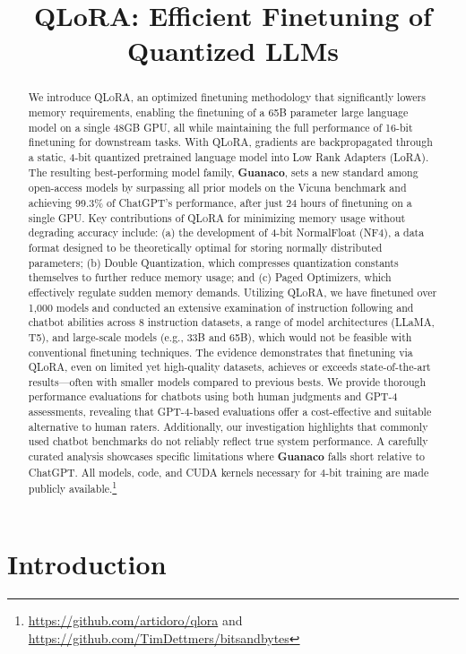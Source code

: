 \title{QLoRA: Efficient Finetuning of Quantized LLMs}

\begin{abstract}
We introduce \textsc{QLoRA}, an optimized finetuning methodology that significantly lowers memory requirements, enabling the finetuning of a 65B parameter large language model on a single 48GB GPU, all while maintaining the full performance of 16-bit finetuning for downstream tasks. With \textsc{QLoRA}, gradients are backpropagated through a static, 4-bit quantized pretrained language model into Low Rank Adapters (LoRA). The resulting best-performing model family, \textbf{Guanaco}, sets a new standard among open-access models by surpassing all prior models on the Vicuna benchmark and achieving 99.3\% of ChatGPT's performance, after just 24 hours of finetuning on a single GPU. Key contributions of \textsc{QLoRA} for minimizing memory usage without degrading accuracy include: (a) the development of 4-bit NormalFloat (NF4), a data format designed to be theoretically optimal for storing normally distributed parameters; (b) Double Quantization, which compresses quantization constants themselves to further reduce memory usage; and (c) Paged Optimizers, which effectively regulate sudden memory demands. Utilizing \textsc{QLoRA}, we have finetuned over 1,000 models and conducted an extensive examination of instruction following and chatbot abilities across 8 instruction datasets, a range of model architectures (LLaMA, T5), and large-scale models (e.g., 33B and 65B), which would not be feasible with conventional finetuning techniques. The evidence demonstrates that finetuning via QLoRA, even on limited yet high-quality datasets, achieves or exceeds state-of-the-art results—often with smaller models compared to previous bests. We provide thorough performance evaluations for chatbots using both human judgments and GPT-4 assessments, revealing that GPT-4-based evaluations offer a cost-effective and suitable alternative to human raters. Additionally, our investigation highlights that commonly used chatbot benchmarks do not reliably reflect true system performance. A carefully curated analysis showcases specific limitations where \textbf{Guanaco} falls short relative to ChatGPT. All models, code, and CUDA kernels necessary for 4-bit training are made publicly available.\footnote{\url{https://github.com/artidoro/qlora} and \url{https://github.com/TimDettmers/bitsandbytes}}
\end{abstract}

\section{Introduction}

